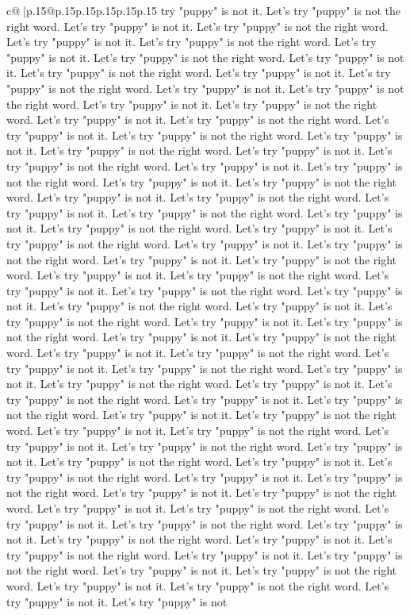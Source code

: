 \documentclass{article}
\begin{document}
{\begin{supertabular}{c@{$\;$}|p{.15\linewidth}@{}p{.15\linewidth}p{.15\linewidth}p{.15\linewidth}p{.15\linewidth}p{.15\linewidth}}
{{{try "puppy" is not it. Let's try "puppy" is not the right word. Let's try "puppy" is not it. Let's try "puppy" is not the right word. Let's try "puppy" is not it. Let's try "puppy" is not the right word. Let's try "puppy" is not it. Let's try "puppy" is not the right word. Let's try "puppy" is not it. Let's try "puppy" is not the right word. Let's try "puppy" is not it. Let's try "puppy" is not the right word. Let's try "puppy" is not it. Let's try "puppy" is not the right word. Let's try "puppy" is not it. Let's try "puppy" is not the right word. Let's try "puppy" is not it. Let's try "puppy" is not the right word. Let's try "puppy" is not it. Let's try "puppy" is not the right word. Let's try "puppy" is not it. Let's try "puppy" is not the right word. Let's try "puppy" is not it. Let's try "puppy" is not the right word. Let's try "puppy" is not it. Let's try "puppy" is not the right word. Let's try "puppy" is not it. Let's try "puppy" is not the right word. Let's try "puppy" is not it. Let's try "puppy" is not the right word. Let's try "puppy" is not it. Let's try "puppy" is not the right word. Let's try "puppy" is not it. Let's try "puppy" is not the right word. Let's try "puppy" is not it. Let's try "puppy" is not the right word. Let's try "puppy" is not it. Let's try "puppy" is not the right word. Let's try "puppy" is not it. Let's try "puppy" is not the right word. Let's try "puppy" is not it. Let's try "puppy" is not the right word. Let's try "puppy" is not it. Let's try "puppy" is not the right word. Let's try "puppy" is not it. Let's try "puppy" is not the right word. Let's try "puppy" is not it. Let's try "puppy" is not the right word. Let's try "puppy" is not it. Let's try "puppy" is not the right word. Let's try "puppy" is not it. Let's try "puppy" is not the right word. Let's try "puppy" is not it. Let's try "puppy" is not the right word. Let's try "puppy" is not it. Let's try "puppy" is not the right word. Let's try "puppy" is not it. Let's try "puppy" is not the right word. Let's try "puppy" is not it. Let's try "puppy" is not the right word. Let's try "puppy" is not it. Let's try "puppy" is not the right word. Let's try "puppy" is not it. Let's try "puppy" is not the right word. Let's try "puppy" is not it. Let's try "puppy" is not the right word. Let's try "puppy" is not it. Let's try "puppy" is not the right word. Let's try "puppy" is not it. Let's try "puppy" is not the right word. Let's try "puppy" is not it. Let's try "puppy" is not the right word. Let's try "puppy" is not it. Let's try "puppy" is not the right word. Let's try "puppy" is not it. Let's try "puppy" is not the right word. Let's try "puppy" is not it. Let's try "puppy" is not the right word. Let's try "puppy" is not it. Let's try "puppy" is not the right word. Let's try "puppy" is not it. Let's try "puppy" is not the right word. Let's try "puppy" is not it. Let's try "puppy" is not the right word. Let's try "puppy" is not it. Let's try "puppy" is not the right word. Let's try "puppy" is not it. Let's try "puppy" is not the right word. Let's try "puppy" is not it. Let's try "puppy" is not the right word. Let's try "puppy" is not it. Let's try "puppy" is not }}}
\end{supertabular}}
\end{document}
